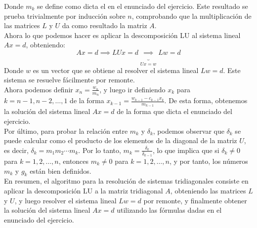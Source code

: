 {\[        \]
    Donde $m_k$ se define como dicta el en el enunciado del ejercicio. Este resultado se prueba trivialmente por inducción sobre $n$, comprobando que la multiplicación de las matrices $L$ y $U$ da como resultado la matriz $A$.\\
    Ahora lo que podemos hacer es aplicar la descomposición LU al sistema lineal $Ax = d$, obteniendo:
    \[
    Ax = d \implies
    LUx = d \underbrace{\implies}_{Ux = w}
    Lw = d
    \]
    Donde $w$ es un vector que se obtiene al resolver el sistema lineal $Lw = d$. Este sistema se resuelve fácilmente por remonte.\\
    Ahora podemos definir $x_n = \frac{w_n}{m_n}$, y luego ir definiendo $x_k$ para $k = n-1, n-2, \ldots, 1$ de la forma $x_{k-1} = \frac{w_{k-1} - c_{k-1} x_k}{m_{k-1}}$. De esta forma, obtenemos la solución del sistema lineal $Ax = d$ de la forma que dicta el enunciado del ejercicio.\\
    Por último, para probar la relación entre $m_k$ y $\delta_k$, podemos observar que $\delta_k$ se puede calcular como el producto de los elementos de la diagonal de la matriz $U$, es decir, $\delta_k = m_1 m_2 \cdots m_k$. Por lo tanto, $m_k = \frac{\delta_k}{\delta_{k-1}}$, lo que implica que si $\delta_k \neq 0$ para $k = 1, 2, \ldots, n$, entonces $m_k \neq 0$ para $k = 1, 2, \ldots, n$, y por tanto, los números $m_k$ y $g_k$ están bien definidos.\\
    En resumen, el algoritmo para la resolución de sistemas tridiagonales consiste en aplicar la descomposición LU a la matriz tridiagonal $A$, obteniendo las matrices $L$ y $U$, y luego resolver el sistema lineal $Lw = d$ por remonte, y finalmente obtener la solución del sistema lineal $Ax = d$ utilizando las fórmulas dadas en el enunciado del ejercicio.
}










